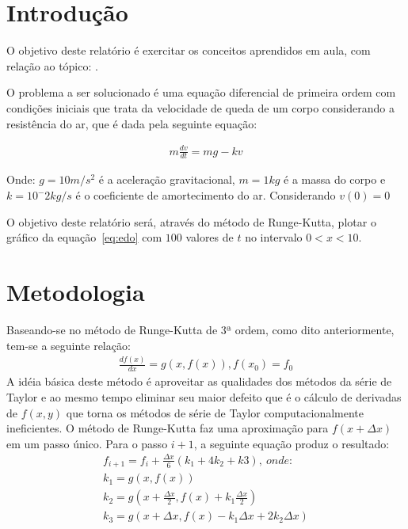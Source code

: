 \documentclass[12pt, hidelinks]{article}
\makeatletter
\let\thetitle\@title
\makeatother
\begin{document}
\section{Introdução}

O objetivo deste relatório é exercitar os conceitos aprendidos em aula, com relação ao tópico: \thetitle.

O problema a ser solucionado é uma equação diferencial de primeira ordem com condições iniciais que trata da velocidade de queda de um corpo considerando a resistência do ar, que é dada pela seguinte equação:

\begin{eqnarray}\label{eq:edo}
  m\frac{dv}{dt} = mg - kv
\end{eqnarray}

Onde: $g = 10m/s^2$ é a aceleração gravitacional, $m = 1kg$ é a massa do corpo e $k = 10^-2 kg/s$ é o coeficiente de amortecimento do ar. Considerando $v(0) = 0$

O objetivo deste relatório será, através do método de Runge-Kutta, plotar o gráfico da equação~\eqref{eq:edo} com $100$ valores de $t$ no intervalo $0 < x < 10$.

\section{Metodologia}
Baseando-se no método de Runge-Kutta de 3ª ordem, como dito anteriormente, tem-se a seguinte relação:
\begin{eqnarray}\label{eq:runge-kutta}
  \frac{df(x)}{dx} = g(x, f(x)), f(x_0) = f_0
\end{eqnarray}
A idéia básica deste método é aproveitar as qualidades dos métodos da série de Taylor e
ao mesmo tempo eliminar seu maior defeito que é o cálculo de derivadas de $f(x, y)$ que
 torna os métodos de série de Taylor computacionalmente ineficientes.
O método de Runge-Kutta faz uma aproximação para $f(x+\Delta x)$ em um passo único. Para o passo $i + 1$, a seguinte equação produz o resultado:
\begin{eqnarray}\label{eq:runge-kutta2}
  f_{i+1} = f_i + \frac{\Delta x}{6}(k_1 + 4k_2 + k3),~onde:\nonumber\\
  k_1 = g(x, f(x))\nonumber\\
  k_2 = g(x + \frac{\Delta x}{2}, f(x) + k_1\frac{\Delta x}{2})\nonumber\\
  k_3 = g(x + \Delta x, f(x) - k_1\Delta x + 2k_2\Delta x)
\end{eqnarray}
\end{document}
